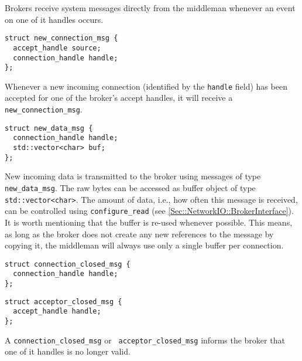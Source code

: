 Brokers receive system messages directly from the middleman whenever an event on one of it handles occurs.

\begin{lstlisting}
struct new_connection_msg {
  accept_handle source;
  connection_handle handle;
};
\end{lstlisting}

Whenever a new incoming connection (identified by the \lstinline^handle^ field) has been accepted for one of the broker's accept handles, it will receive a \lstinline^new_connection_msg^.

\begin{lstlisting}
struct new_data_msg {
  connection_handle handle;
  std::vector<char> buf;
};
\end{lstlisting}

New incoming data is transmitted to the broker using messages of type \lstinline^new_data_msg^.
The raw bytes can be accessed as buffer object of type \lstinline^std::vector<char>^.
The amount of data, i.e., how often this message is received, can be controlled using \lstinline^configure_read^ (see \ref{Sec::NetworkIO::BrokerInterface}).
It is worth mentioning that the buffer is re-used whenever possible.
This means, as long as the broker does not create any new references to the message by copying it, the middleman will always use only a single buffer per connection.

\begin{lstlisting}
struct connection_closed_msg {
  connection_handle handle;
};
\end{lstlisting}

\begin{lstlisting}
struct acceptor_closed_msg {
  accept_handle handle;
};
\end{lstlisting}


A \lstinline^connection_closed_msg^ or \lstinline^ acceptor_closed_msg^ informs the broker that one of it handles is no longer valid.
